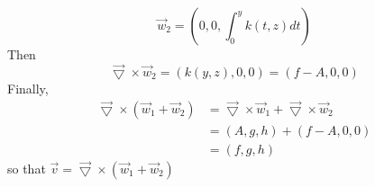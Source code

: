 \documentclass[11pt]{article}
\theoremstyle{definition}
\begin{document}
\begin{equation}
\overrightarrow{w}_2 = \left( 0,0, \int_0^y k \left( t, z \right) dt \right)
\end{equation}
Then
\begin{equation}
\overrightarrow{\bigtriangledown} \times \overrightarrow{w}_2 = \left( k \left( y,z \right) , 0 , 0 \right) = \left( f-A,0,0 \right)
\end{equation}
Finally,
\begin{equation}
\begin{split}
\overrightarrow{\bigtriangledown} \times \left( \overrightarrow{w}_1 + \overrightarrow{w}_2 \right) & =
\overrightarrow{\bigtriangledown} \times \overrightarrow{w}_1 + \overrightarrow{\bigtriangledown} \times \overrightarrow{w}_2 \\
& = \left( A , g, h \right) + \left( f - A, 0 , 0 \right) \\
& = \left( f,g,h \right)
\end{split}
\end{equation}
so that $\overrightarrow{v} = \overrightarrow{\bigtriangledown} \times \left( \overrightarrow{w}_1 + \overrightarrow{w}_2 \right)$
\end{document}
